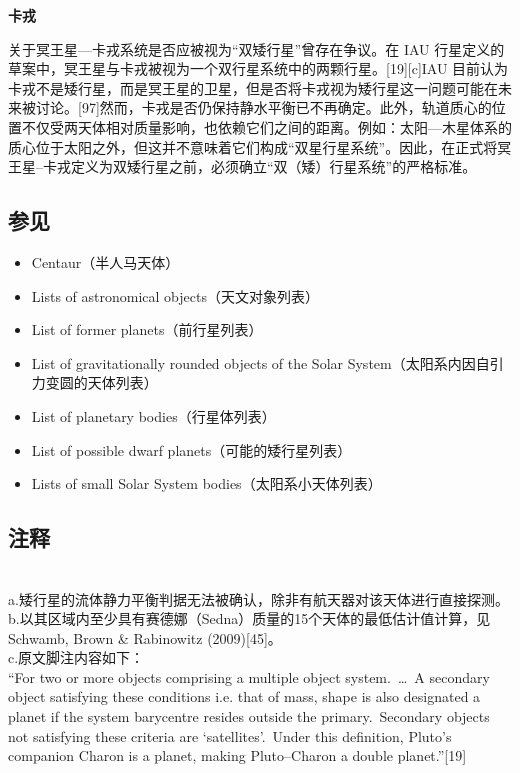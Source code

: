 \textbf{卡戎}

关于冥王星—卡戎系统是否应被视为“双矮行星”曾存在争议。在 IAU 行星定义的草案中，冥王星与卡戎被视为一个双行星系统中的两颗行星。[19][c]IAU 目前认为卡戎不是矮行星，而是冥王星的卫星，但是否将卡戎视为矮行星这一问题可能在未来被讨论。[97]然而，卡戎是否仍保持静水平衡已不再确定。此外，轨道质心的位置不仅受两天体相对质量影响，也依赖它们之间的距离。例如：太阳—木星体系的质心位于太阳之外，但这并不意味着它们构成“双星行星系统”。因此，在正式将冥王星–卡戎定义为双矮行星之前，必须确立“双（矮）行星系统”的严格标准。
\subsection{参见}
\begin{itemize}
\item Centaur（半人马天体）\\
\item Lists of astronomical objects（天文对象列表）\\
\item List of former planets（前行星列表）\\
\item List of gravitationally rounded objects of the Solar System（太阳系内因自引力变圆的天体列表）\\
\item List of planetary bodies（行星体列表）\\
\item List of possible dwarf planets（可能的矮行星列表）\\
\item Lists of small Solar System bodies（太阳系小天体列表）
\end{itemize}
\subsection{注释}\\
a.矮行星的流体静力平衡判据无法被确认，除非有航天器对该天体进行直接探测。\\
b.以其区域内至少具有赛德娜（Sedna）质量的15个天体的最低估计值计算，见 Schwamb, Brown \& Rabinowitz (2009)[45]。\\
c.原文脚注内容如下：\\
“For two or more objects comprising a multiple object system.~…~A secondary object satisfying these conditions i.e. that of mass, shape is also designated a planet if the system barycentre resides outside the primary.~Secondary objects not satisfying these criteria are ‘satellites’.~Under this definition, Pluto’s companion Charon is a planet, making Pluto–Charon a double planet.”[19]
